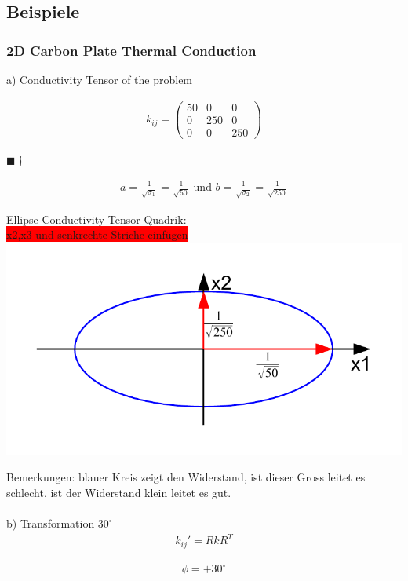 \documentclass[a4paper]{scrartcl}
\newcommand{\qed}{\begin{flushright}
$\blacksquare \dagger$ \end{flushright}}
\begin{document}
\subsection{Beispiele}
\subsubsection{2D Carbon Plate Thermal Conduction}

a) Conductivity Tensor of the problem

\begin{align}
k_{ij}=\begin{pmatrix}
50 & 0 & 0 \\
0 & 250 & 0 \\
0 & 0 & 250 
\end{pmatrix}
\end{align}
\qed
\begin{align}
a = \frac{1}{\sqrt{\sigma_1}} = \frac{1}{\sqrt{50}} \text{ und } b =
\frac{1}{\sqrt{\sigma_2}} = \frac{1}{\sqrt{250}}
\end{align}

\begin{center}
Ellipse Conductivity Tensor Quadrik:\\
\colorbox{red}{x2,x3 und senkrechte Striche einfügen}
\includegraphics[scale=0.8]{images/quadrik_2d_ellipse_uebung.pdf}
\end{center}
Bemerkungen: blauer Kreis zeigt den Widerstand, ist dieser Gross leitet es schlecht, ist der Widerstand klein leitet es gut.
\\
\\
b) Transformation $30^\circ$
\begin{align}
k_{ij}'=RkR^{T}
\end{align}

\begin{align}
\phi=+30^\circ
\end{align}
\end{document}
